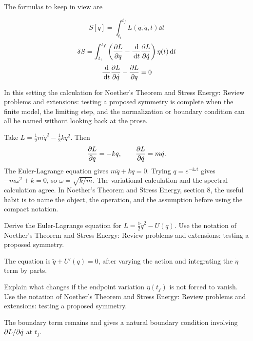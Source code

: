 The formulas to keep in view are

\[
  S[q]=\int_{t_i}^{t_f}L(q,\dot q,t)\dd t
\]
\[
  \delta S=\int_{t_i}^{t_f}\left(\frac{\partial L}{\partial q}-\frac{\,\mathrm d}{\,\mathrm d t}\frac{\partial L}{\partial\dot q}\right)\eta(t)\,\mathrm d t
\]
\[
  \frac{\,\mathrm d}{\,\mathrm d t}\frac{\partial L}{\partial\dot q}-\frac{\partial L}{\partial q}=0
\]

In this setting the calculation for Noether's Theorem and Stress Energy: Review problems and extensions: testing a proposed symmetry is complete when the finite model, the limiting step, and the normalization or boundary condition can all be named without looking back at the prose.




\begin{example}
Take \(L=\frac12m\dot q^2-\frac12kq^2\).  Then
\[
  \frac{\partial L}{\partial q}=-kq,\qquad \frac{\partial L}{\partial\dot q}=m\dot q.
\]
The Euler-Lagrange equation gives \(m\ddot q+kq=0\).  Trying \(q=e^{-\ii\omega t}\) gives \(-m\omega^2+k=0\), so \(\omega=\sqrt{k/m}\).  The variational calculation and the spectral calculation agree.  In Noether's Theorem and Stress Energy, section 8, the useful habit is to name the object, the operation, and the assumption before using the compact notation.
\end{example}



\begin{exercise}
Derive the Euler-Lagrange equation for \(L=\frac12\dot q^2-U(q)\).  Use the notation of Noether's Theorem and Stress Energy: Review problems and extensions: testing a proposed symmetry.
\begin{answer}
The equation is \(\ddot q+U'(q)=0\), after varying the action and integrating the \(\dot\eta\) term by parts.
\end{answer}
\end{exercise}

\begin{exercise}
Explain what changes if the endpoint variation \(\eta(t_f)\) is not forced to vanish.  Use the notation of Noether's Theorem and Stress Energy: Review problems and extensions: testing a proposed symmetry.
\begin{answer}
The boundary term remains and gives a natural boundary condition involving \(\partial L/\partial\dot q\) at \(t_f\).
\end{answer}
\end{exercise}



